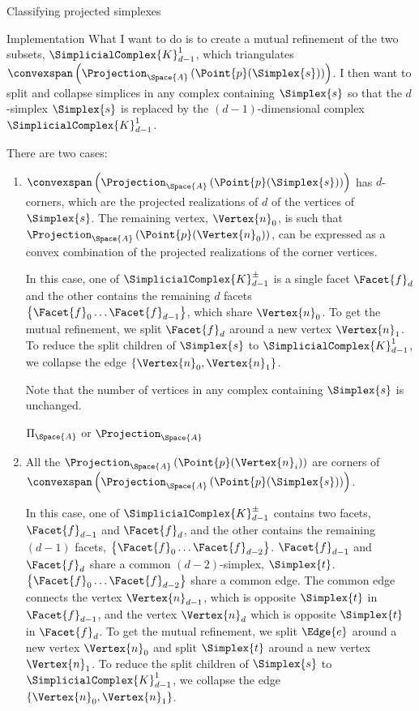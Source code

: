 \begin{plSection}{Classifying projected simplexes}
\begin{plSection}{Implementation}
What I want to do is to create a mutual refinement of the two subsets,
$\SimplicialComplex{K}_{d-1}^{1}$,
which triangulates
$\convexspan \left( \Projection_{\Space{A}} \left( \Point{p} ( \Simplex{s} ) \right) \right)$.
I then want to split and collapse simplices in any complex containing $\Simplex{s}$
so that the $d$-simplex $\Simplex{s}$ is replaced by the $(d-1)$-dimensional
complex $\SimplicialComplex{K}_{d-1}^{1}$.

There are two cases:
\begin{enumerate}

\item $\convexspan \left( \Projection_{\Space{A}} \left( \Point{p} ( \Simplex{s} ) \right) \right)$
has $d$-corners, which are the projected realizations of $d$
of the vertices of $\Simplex{s}$.
The remaining vertex, $\Vertex{n}_0$,
is such that
$\Projection_{\Space{A}} \left( \Point{p} ( \Vertex{n}_0 ) \right)$,
can be expressed
as a convex combination of the projected realizations of the corner vertices.

In this case, one of $\SimplicialComplex{K}_{d-1}^{\pm}$ is a single facet $\Facet{f}_d$
and the other contains the remaining $d$ facets $\left\{\Facet{f}_0 \ldots \Facet{f}_{d-1} \right\}$,
which share $\Vertex{n}_0$.
To get the mutual refinement, we split $\Facet{f}_d$ around a new vertex $\Vertex{n}_1$.
To reduce the split children of $\Simplex{s}$ to $\SimplicialComplex{K}_{d-1}^{1}$,
we collapse the edge $\left\{ \Vertex{n}_0 , \Vertex{n}_1 \right\}$.

Note that the number of vertices in any complex containing $\Simplex{s}$
is unchanged.

$\Pi_{\Space{A}}$ or $\Projection_{\Space{A}}$

\item All the $\Projection_{\Space{A}} \left( \Point{p} ( \Vertex{n}_i ) \right) $
are corners of
$\convexspan \left( \Projection_{\Space{A}} \left( \Point{p} ( \Simplex{s} ) \right) \right)$.

In this case, one of $\SimplicialComplex{K}_{d-1}^{\pm}$
contains two facets, $\Facet{f}_{d-1}$ and $\Facet{f}_{d}$,
and the other contains the remaining $(d-1)$ facets, $\left\{\Facet{f}_0 \ldots \Facet{f}_{d-2} \right\}$.
$\Facet{f}_{d-1}$ and $\Facet{f}_{d}$ share a common $(d-2)$-simplex, $\Simplex{t}$.
$\left\{\Facet{f}_0 \ldots \Facet{f}_{d-2} \right\}$ share a common edge.
The common edge connects the vertex $\Vertex{n}_{d-1}$,
which is opposite $\Simplex{t}$ in $\Facet{f}_{d-1}$,
and the vertex $\Vertex{n}_{d}$
which is opposite $\Simplex{t}$ in $\Facet{f}_{d}$.
To get the mutual refinement, we split $\Edge{e}$ around a new vertex $\Vertex{n}_0$
and split $\Simplex{t}$ around a new vertex $\Vertex{n}_1$.
To reduce the split children of $\Simplex{s}$ to $\SimplicialComplex{K}_{d-1}^{1}$,
we collapse the edge $\left\{ \Vertex{n}_0 , \Vertex{n}_1 \right\}$.


\end{enumerate}
\end{plSection}
\end{plSection}
